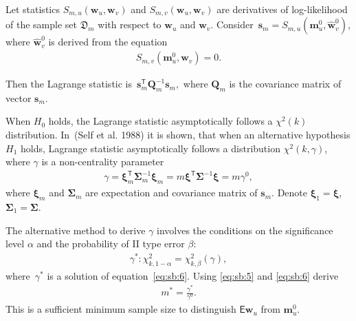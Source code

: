 \documentclass[
11pt,%
tightenlines,%
twoside,%
onecolumn,%
nofloats,%
nobibnotes,%
nofootinbib,%
superscriptaddress,%
noshowpacs,%
centertags]%
{revtex4}
\begin{document}
Let statistics $S_{m,u}\left(\textbf{w}_{u}, \textbf{w}_{v}\right)$ and $S_{m,v}\left(\textbf{w}_{u}, \textbf{w}_{v}\right)$ are derivatives of log-likelihood of the sample set $\mathfrak{D}_{m}$ with respect to $\textbf{w}_{u}$ and $\textbf{w}_{v}$.
Consider~$\textbf{s}_{m} = S_{m,u}\left(\textbf{m}^{0}_{u}, \hat{\textbf{w}}^{0}_{v}\right)$, where $\hat{\textbf{w}}^{0}_{v}$ is derived from the equation
\[
\label{eq:sb:3}
\begin{aligned}
	S_{m,v}\left(\textbf{m}^{0}_{u}, \textbf{w}_{v}\right) = 0.
\end{aligned}
\]

Then the Lagrange statistic is~$\textbf{s}^{\mathsf{T}}_{m}\textbf{Q}_{m}^{-1}\textbf{s}_{m},$ where $\textbf{Q}_{m}$ is the covariance matrix of vector $\textbf{s}_{m}$.
	
When $H_0$ holds, the Lagrange statistic asymptotically follows a $\chi^2(k)$ distribution.  In~(Self et al. 1988) it is shown, that when an alternative hypothesis $H_1$ holds,  Lagrange statistic asymptotically follows a distribution $\chi^2(k,\gamma)$, where $\gamma$ is a non-centrality parameter
\[
\label{eq:sb:5}
\begin{aligned}
	\gamma = \bm{\xi}_{m}^{\mathsf{T}}\bm{\Sigma}^{-1}_{m}\bm{\xi}_{m} = m\bm{\xi}^{\mathsf{T}}\bm{\Sigma}^{-1}\bm{\xi}= m\gamma^0,
\end{aligned}
\]
where $\bm{\xi}_{m}$ and $\bm{\Sigma}_{m}$ are expectation and covariance matrix of $\textbf{s}_{m}$. Denote $\bm{\xi}_1 = \bm{\xi}$,  $\bm{\Sigma}_1 = \bm{\Sigma}$. 
	
The alternative method to derive $\gamma$ involves the conditions on the significance level $\alpha$ and the probability of II type error $\beta$:
\[
\label{eq:sb:6}
\begin{aligned}
	\gamma^*: \chi^2_{k, 1-\alpha} = \chi^2_{k, \beta}\left(\gamma\right),
\end{aligned}
\]
where~$\gamma^*$ is a solution of equation~\eqref{eq:sb:6}.
Using \eqref{eq:sb:5} and \eqref{eq:sb:6} derive
\[
\label{eq:sb:7}
\begin{aligned}
	m^* = \frac{\gamma^*}{\gamma^0}.
\end{aligned}
\]
This is a sufficient minimum sample size to distinguish $\mathsf{E}\textbf{w}_{u}$ from $\textbf{m}^0_{u}$.
\end{document}
